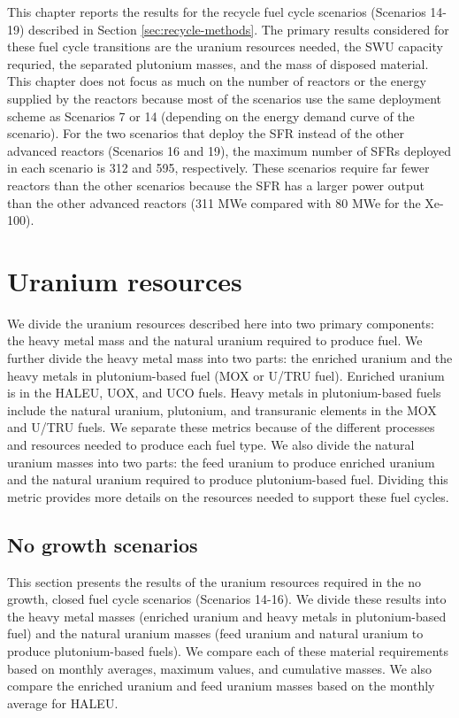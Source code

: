 This chapter reports the results for the recycle fuel cycle 
scenarios (Scenarios 14-19) described 
in Section \ref{sec:recycle-methods}. The primary results considered 
for these fuel cycle transitions are the uranium resources needed, 
the \gls{SWU} capacity requried, the separated plutonium masses, 
and the mass of disposed material. This chapter does not focus 
as much on the number of reactors or the energy supplied by 
the reactors because most of the scenarios use the same 
deployment scheme as Scenarios 7 or 14 (depending on 
the energy demand curve of the scenario). For the two 
scenarios that deploy the \gls{SFR} instead of the other 
advanced reactors (Scenarios 16 and 19), the maximum number 
of \glspl{SFR} deployed in each scenario is 312 and 595, 
respectively. 
These scenarios require far fewer reactors than the other scenarios 
because the \gls{SFR} has a larger power output than the other 
advanced reactors (311 MWe compared with 80 MWe for the Xe-100).

\section{Uranium resources}
We divide the uranium resources described here into two primary 
components: the heavy metal mass and the natural uranium 
required to produce fuel. We further divide the heavy metal 
mass into two parts: the enriched uranium and the 
heavy metals in plutonium-based fuel (\gls{MOX} or U/TRU fuel). 
Enriched uranium is in the 
\gls{HALEU}, \gls{UOX}, and UCO fuels. Heavy metals in plutonium-based 
fuels include the natural uranium, plutonium, and transuranic 
elements in 
the \gls{MOX} and U/TRU fuels. We separate these metrics 
because of the different processes and resources needed to 
produce each fuel type. We also divide the natural uranium 
masses into two parts: the feed uranium to produce enriched uranium 
and the natural uranium required to produce 
plutonium-based fuel. Dividing this metric provides more details 
on the resources needed to support these fuel cycles. 

\subsection{No growth scenarios}
This section presents the results of the uranium resources required 
in the no growth, closed fuel cycle scenarios (Scenarios 14-16). 
We divide these results into the heavy metal masses (enriched uranium 
and heavy metals in plutonium-based fuel) and the natural 
uranium masses (feed uranium and natural uranium to produce 
plutonium-based fuels). We compare each of these material requirements 
based on monthly averages, maximum values, 
and cumulative masses. We also compare the enriched uranium and feed uranium 
masses based on the monthly average for \gls{HALEU}. 

